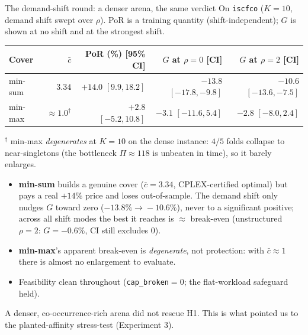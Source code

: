 \documentclass[11pt,aspectratio=169]{beamer}
\newcommand{\bd}[1]{\textcolor{bad}{#1}}
\begin{document}
\begin{frame}{The demand-shift round: a denser arena, the same verdict}
  On \texttt{iscfco} ($K{=}10$, demand shift swept over $\rho$). PoR is a training quantity (shift-independent); $G$ is shown at no shift and at the strongest shift.
  \begin{table}\centering\small
  \begin{tabular}{@{}lrrrr@{}}
  \toprule
  Cover & $\bar c$ & PoR (\%) [95\% CI] & $G$ at $\rho{=}0$ [CI] & $G$ at $\rho{=}2$ [CI]\\
  \midrule
  min-sum & $3.34$ & \bd{$+14.0$} $[9.9,18.2]$ & \bd{$-13.8$} $[-17.8,-9.8]$ & \bd{$-10.6$} $[-13.6,-7.5]$\\
  min-max & $\approx\!1.0^{\dagger}$ & $+2.8$ $[-5.2,10.8]$ & $-3.1$ $[-11.6,5.4]$ & $-2.8$ $[-8.0,2.4]$\\
  \bottomrule
  \end{tabular}
  \end{table}
  \footnotesize $^{\dagger}$ min-max \emph{degenerates} at $K{=}10$ on the dense instance: $4/5$ folds collapse to near-singletons (the bottleneck $\Pi\approx118$ is unbeaten in time), so it barely enlarges.
  \begin{itemize}
    \item \textbf{min-sum} builds a genuine cover ($\bar c{=}3.34$, CPLEX-certified optimal) but pays a real \bd{$+14\%$} price and \bd{loses out-of-sample}. The demand shift only nudges $G$ toward zero ($-13.8\%\!\to\!-10.6\%$), never to a significant positive; across all shift modes the best it reaches is $\approx$ break-even (unstructured $\rho{=}2$: $G=-0.6\%$, CI still excludes $0$).
    \item \textbf{min-max}'s apparent break-even is \emph{degenerate}, not protection: with $\bar c\approx1$ there is almost no enlargement to evaluate.
    \item Feasibility clean throughout (\texttt{cap\_broken}$=0$; the flat-workload safeguard held).
  \end{itemize}
  \begin{alertblock}{}
  A denser, co-occurrence-rich arena did not rescue H1. This is what pointed us to the planted-affinity stress-test (Experiment 3).
  \end{alertblock}
\end{frame}
\end{document}
